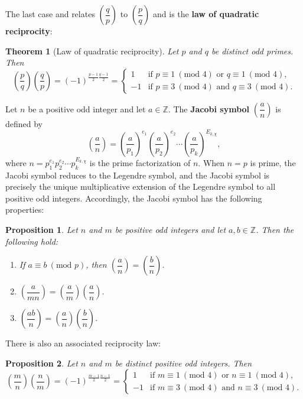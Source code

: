 \documentclass[12pt]{book}
\newtheorem{theorem}{Theorem}[section]
\newtheorem{proposition}{Proposition}[section]
\theoremstyle{definition}\newframedtheorem{method}{Method}
\newcommand{\legendre}[2]{\genfrac{(}{)}{0.5pt}{0}{#1}{#2}}
\newcommand{\tmod}[1]{\ \left(\text{mod }#1\right)}
\newcommand{\Z}{\mathbb{Z}}
\newcommand{\<}{\langle}
\renewcommand{\>}{\rangle}
\begin{document}
    The last case and relates $\legendre{q}{p}$ to $\legendre{p}{q}$ and is the \textbf{law of quadratic reciprocity}:
    \begin{theorem}[Law of quadratic reciprocity]
      Let $p$ and $q$ be distinct odd primes. Then
      \[
        \legendre{p}{q}\legendre{q}{p} = (-1)^{\frac{p-1}{2}\frac{q-1}{2}} = \begin{cases} 1 & \text{if $p \equiv 1 \tmod{4}$ or $q \equiv 1 \tmod{4}$}, \\ -1 & \text{if $p \equiv 3 \tmod{4}$ and $q \equiv 3 \tmod{4}$}. \end{cases}
      \]
    \end{theorem}
    Let $n$ be a positive odd integer and let $a \in \Z$. The \textbf{Jacobi symbol} $\legendre{a}{n}$ is defined by
    \[
      \legendre{a}{n} = \legendre{a}{p_{1}}^{e_{1}}\legendre{a}{p_{2}}^{e_{2}} \cdots \legendre{a}{p_{k}}^{E_{k,\chi}},
    \]
    where $n = p_{1}^{e_{1}}p_{2}^{e_{2}} \cdots p_{k}^{E_{k,\chi}}$ is the prime factorization of $n$. When $n = p$ is prime, the Jacobi symbol reduces to the Legendre symbol, and the Jacobi symbol is precisely the unique multiplicative extension of the Legendre symbol to all positive odd integers. Accordingly, the Jacobi symbol has the following properties:
    \begin{proposition}
      Let $n$ and $m$ be positive odd integers and let $a,b \in \Z$. Then the following hold:
      \begin{enumerate}[label=(\roman*)]
        \item If $a \equiv b \tmod{p}$, then $\legendre{a}{n} = \legendre{b}{n}$.
        \item $\legendre{a}{mn} = \legendre{a}{m}\legendre{a}{n}$.
        \item $\legendre{ab}{n} = \legendre{a}{n}\legendre{b}{n}$.
      \end{enumerate}
    \end{proposition}
    There is also an associated reciprocity law:
    \begin{proposition}
      Let $n$ and $m$ be distinct positive odd integers. Then
      \[
        \legendre{m}{n}\legendre{n}{m} = (-1)^{\frac{m-1}{2}\frac{n-1}{2}} = \begin{cases} 1 & \text{if $m \equiv 1 \tmod{4}$ or $n \equiv 1 \tmod{4}$}, \\ -1 & \text{if $m \equiv 3 \tmod{4}$ and $n \equiv 3 \tmod{4}$}. \end{cases}
      \]
    \end{proposition}
\end{document}
